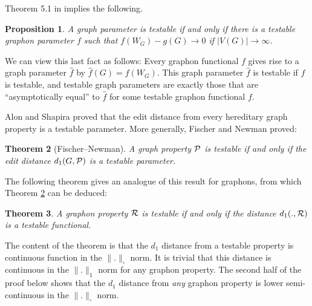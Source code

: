 \documentclass{article}
\newtheorem{theorem}{Theorem}[section]
\newtheorem{prop}[theorem]{Proposition}
\begin{document}
Theorem 5.1 in \cite{BCLSV1} implies the following.

\begin{prop}\label{PARAM-TEST}
A graph parameter is testable if and only if there is a testable
graphon parameter $f$ such that $f(W_G)-g(G)\to 0$ if $|V(G)|\to
\infty$.
\end{prop}

We can view this last fact as follows: Every graphon functional $f$
gives rise to a graph parameter $\widehat{f}$ by
$\widehat{f}(G)=f(W_G)$. This graph parameter $\widehat{f}$ is
testable if $f$ is testable, and testable graph parameters are
exactly those that are ``asymptotically equal'' to $\widehat{f}$ for
some testable graphon functional $f$.

Alon and Shapira \cite{AS} proved that the edit distance from every
hereditary graph property is a testable parameter. More generally,
Fischer and Newman \cite{FN} proved:

\begin{theorem}[Fischer--Newman]\label{dist-test}
A graph property $\mathcal{P}$ is testable if and only if the edit distance
$d_1(G,\mathcal{P})$ is a testable parameter.
\end{theorem}

The following theorem gives an analogue of this result for graphons,
from which Theorem \ref{dist-test} can be deduced:

\begin{theorem}\label{PROPTEST-FN-DIST}
A graphon property $\mathcal{R}$ is testable if and only if the distance
$d_1(.,\mathcal{R})$ is a testable functional.
\end{theorem}

The content of the theorem is that the $d_1$ distance from a testable
property is continuous function in the $\|.\|_\square$ norm. It is
trivial that this distance is continuous in the $\|.\|_1$ norm for
any graphon property. The second half of the proof below shows that
the $d_1$ distance from {\it any} graphon property is lower
semi-continuous in the $\|.\|_\square$ norm.
\end{document}
